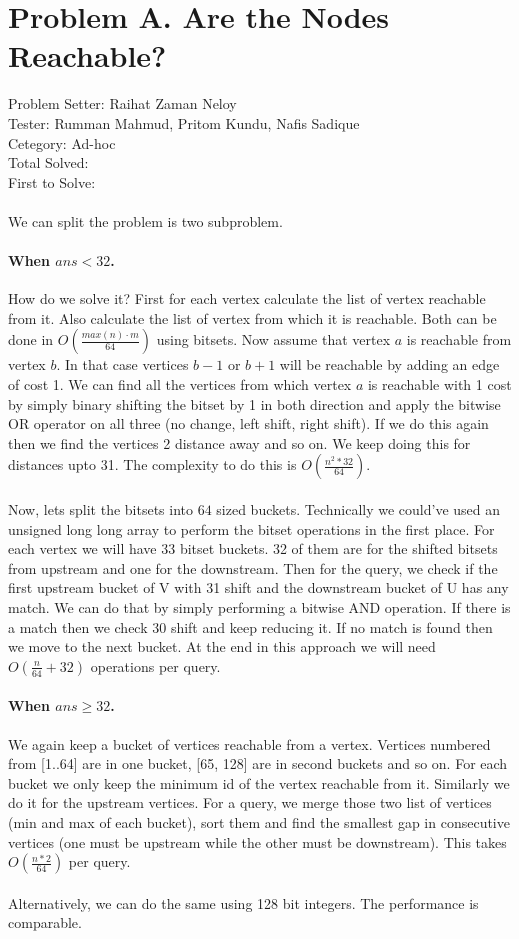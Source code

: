 \documentclass[11pt,a4paper]{article}
\begin{document}
\section*{Problem A. Are the Nodes Reachable?}
Problem Setter: Raihat Zaman Neloy\\
Tester: Rumman Mahmud, Pritom Kundu, Nafis Sadique\\
Cetegory: Ad-hoc\\
Total Solved: \\
First to Solve: \\
\\
We can split the problem is two subproblem.
\paragraph*{When $ans < 32$.}
 How do we solve it? First for each vertex calculate the list of vertex reachable from it. Also 
calculate the list of vertex from which it is reachable. Both can be done in $O(\frac{max(n) \cdot m}{64})$ using bitsets.
Now assume that vertex $a$ is reachable from vertex $b$. In that case vertices $b-1$ or $b+1$ will be reachable by 
adding an edge of cost 1. We can find all the vertices from which vertex $a$ is reachable with 1 cost by simply
binary shifting the bitset by 1 in both direction and apply the bitwise OR operator on all three (no change, left shift, right shift).
If we do this again then we find the vertices 2 distance away and so on. We keep doing this for distances upto 31. The
complexity to do this is $O(\frac{n^2*32}{64})$. 
\\
\\
Now, lets split the bitsets into $64$ sized buckets. Technically we could've used an unsigned long long array to perform
the bitset operations in the first place. For each vertex we will have 33 bitset buckets. 32 of them are for
the shifted bitsets from upstream and one for the downstream.
Then for the query, we check if the first upstream bucket of V with 31 shift and the downstream bucket of U has any match. We 
can do that by simply performing a bitwise AND operation. If there is a match then we check 30 shift and keep reducing it. If 
no match is found then we move to the next bucket. At the end in this approach we will need $O(\frac{n}{64}+32)$ operations
per query.
\paragraph*{When $ans \ge 32$.}
We again keep a bucket of vertices reachable from a vertex. Vertices numbered from [1..64] are in one bucket, [65, 128] are 
in second buckets and so on. For each bucket we only keep the minimum id of the vertex reachable from it. Similarly we do it 
for the upstream vertices. For a query, we merge those two list of vertices (min and max of each bucket), sort them and find the
smallest gap in consecutive vertices (one must be upstream while the other must be downstream). This takes $O(\frac{n*2}{64})$ per
query.
\\ 
\\
Alternatively, we can do the same using 128 bit integers. The performance is comparable.
\end{document}

